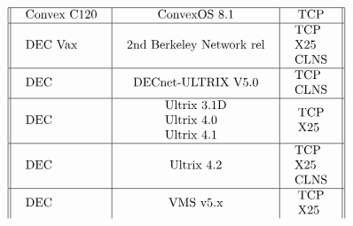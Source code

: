 \[\begin{tabular}[h]{||l|c|c||}
\hline
\begin{tabular}{l} Convex C120 \end{tabular} & \begin{tabular}{l} 	ConvexOS 8.1 \end{tabular} & \begin{tabular}{l} TCP \end{tabular} \\
\hline
\begin{tabular}{l} DEC Vax \end{tabular} & \begin{tabular}{l} 2nd Berkeley Network rel \end{tabular} & \begin{tabular}{l} TCP\\X25\\CLNS \end{tabular} \\
\hline
\begin{tabular}{l} DEC \end{tabular} & \begin{tabular}{l} 	DECnet-ULTRIX V5.0 \end{tabular} & \begin{tabular}{l} TCP\\CLNS \end{tabular} \\
\hline
\begin{tabular}{l} DEC \end{tabular} & \begin{tabular}{l} 	Ultrix 3.1D\\Ultrix 4.0\\ Ultrix 4.1 \end{tabular} & \begin{tabular}{l} TCP\\X25 \end{tabular} \\
\hline
\begin{tabular}{l} DEC \end{tabular} & \begin{tabular}{l} 	Ultrix 4.2 \end{tabular} & \begin{tabular}{l} TCP\\X25\\CLNS \end{tabular} \\
\hline
\begin{tabular}{l} DEC \end{tabular} & \begin{tabular}{l} 	VMS v5.x \end{tabular} & \begin{tabular}{l} TCP\\X25 \end{tabular} \\

\end{tabular}\]
